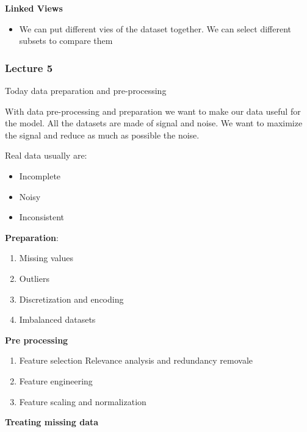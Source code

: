\vspace{10pt}

\textbf{Linked Views}

\begin{itemize}
    \item We can put different vies of the dataset together. We can select different subsets to compare them
\end{itemize}

\subsubsection{Lecture 5}

Today data preparation and pre-processing

\vspace{10pt}

With data pre-processing and preparation we want to make our data useful for the model. All the datasets are made of signal and noise. We want to maximize the signal and reduce as much as possible the noise.

Real data usually are:
\begin{itemize}
    \item Incomplete
    \item Noisy
    \item Inconsistent
\end{itemize}

\vspace{10pt}


\textbf{Preparation}:
\begin{enumerate}
    \item Missing values
    \item Outliers
    \item Discretization and encoding
    \item Imbalanced datasets
\end{enumerate}

\textbf{Pre processing}

\begin{enumerate}
    \item Feature selection \ra Relevance analysis and redundancy removale
    \item Feature engineering
    \item Feature scaling and normalization
\end{enumerate}


\vspace{10pt}

\textbf{Treating missing data}

